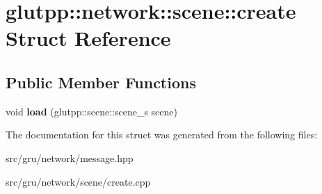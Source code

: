 \hypertarget{structglutpp_1_1network_1_1scene_1_1create}{\section{glutpp\-:\-:network\-:\-:scene\-:\-:create \-Struct \-Reference}
\label{structglutpp_1_1network_1_1scene_1_1create}
}
\subsection*{\-Public \-Member \-Functions}
\begin{DoxyCompactItemize}
\item 
\hypertarget{structglutpp_1_1network_1_1scene_1_1create_a56cb06cff61d5cf2b4036c9208e5ef1a}{void {\bfseries load} (glutpp\-::scene\-::scene\-\_\-s scene)}\label{structglutpp_1_1network_1_1scene_1_1create_a56cb06cff61d5cf2b4036c9208e5ef1a}

\end{DoxyCompactItemize}


\-The documentation for this struct was generated from the following files\-:\begin{DoxyCompactItemize}
\item 
src/gru/network/message.\-hpp\item 
src/gru/network/scene/create.\-cpp\end{DoxyCompactItemize}
